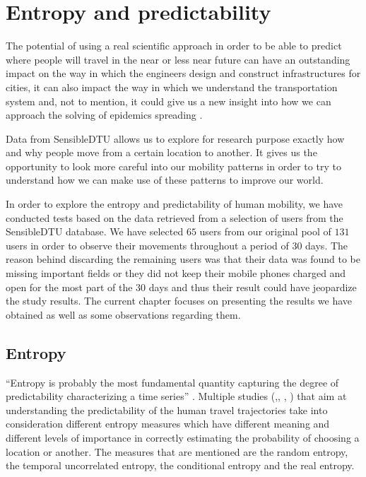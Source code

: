 \chapter{Entropy and predictability}

The potential of using a real scientific approach in order to be able to predict
where people will travel in the near or less near future can have an outstanding
impact on the way in which the engineers design and construct infrastructures
for cities, it can also impact the way in which we understand the transportation
system and, not to mention, it could give us a new insight into how we can
approach the solving of epidemics spreading \cite{Lu13} \cite{Brockmann08}.

Data from SensibleDTU \cite{Stopczynski14m} allows us to explore for research
purpose exactly how and why people move from a certain location to another. It
gives us the opportunity to look more careful into our mobility patterns in
order to try to understand how we can make use of these patterns to improve our
world.

In order to explore the entropy and predictability of human mobility, we have
conducted tests based on the data retrieved from a selection of users from the
SensibleDTU database. We have selected $65$ users from our original pool of
$131$ users in order to observe their movements throughout a period of $30$
days. The reason behind discarding the remaining users was that their data was
found to be missing important fields or they did not keep their mobile phones
charged and open for the most part of the $30$ days and thus their result could
have jeopardize the study results. The current chapter focuses on presenting the
results we have obtained as well as some observations regarding them.

\section{Entropy}

``Entropy is probably the most fundamental quantity capturing the degree of
predictability characterizing a time series'' \cite{Barabasi10}. Multiple
studies (\cite{Sinatra14},\cite{Lu13}, \cite{marin2012exploring},
\cite{Barabasi10}) that aim at understanding the predictability of the human
travel trajectories take into consideration different entropy measures which
have different meaning and different levels of importance in correctly
estimating the probability of choosing a location or another. The measures that
are mentioned are the random entropy, the temporal uncorrelated entropy, the
conditional entropy and the real entropy.

